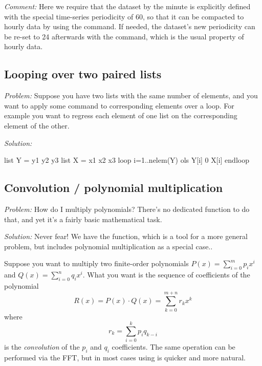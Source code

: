\emph{Comment:} Here we require that the dataset by the minute is
explicitly defined with the special time-series periodicity of 60,
so that it can be compacted to hourly data by using the
 command. If needed, the dataset's new periodicity
can be re-set to 24 afterwards with the  command, which is
the usual property of hourly data.

\subsection{Looping over two paired lists}

\emph{Problem:} Suppose you have two lists with the same number of
elements, and you want to apply some command to corresponding elements
over a loop. For example you want to regress each element of one
list on the corresponding element of the other.

\emph{Solution:}
\begin{code}
list Y = y1 y2 y3
list X = x1 x2 x3
loop i=1..nelem(Y)
   ols Y[i] 0 X[i]
endloop
\end{code}

\subsection{Convolution / polynomial multiplication}

\emph{Problem:} How do I multiply polynomials? There's no dedicated
function to do that, and yet it's a fairly basic mathematical task.

\emph{Solution:} Never fear! We have the  function, which
is a tool for a more general problem, but includes polynomial
multiplication as a special case..

Suppose you want to multiply two finite-order polynomials $P(x) =
\sum_{i=0}^m p_i x^i$ and $Q(x) = \sum_{i=0}^n q_i x^i$. What you want
is the sequence of coefficients of the polynomial
\[
  R(x) = P(x) \cdot Q(x) = \sum_{k=0}^{m+n} r_k x^k
\]
where
\[
  r_k = \sum_{i=0}^k p_i q_{k-i}
\]
is the \emph{convolution} of the $p_i$ and $q_i$ coefficients. The
same operation can be performed via the FFT, but in most cases using
 is quicker and more natural.

